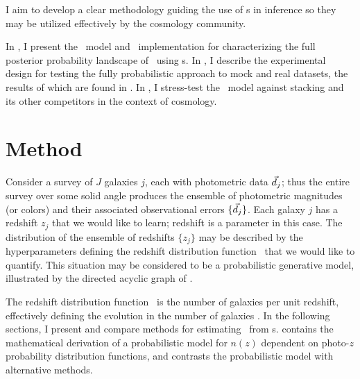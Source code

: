 
I aim to develop a clear methodology guiding the use of \pzpdf s in inference so they may be utilized effectively by the cosmology community.

In , I present the \Chippr\ model and \chippr\ implementation for characterizing the full posterior probability landscape of \Nz\ using \pzpdf s. 
In , I describe the experimental design for testing the fully probabilistic approach to mock and real datasets, the results of which are found in .
In , I stress-test the \Chippr\ model against stacking and its other competitors in the context of cosmology.

\section{Method}


Consider a survey of $J$ galaxies $j$, each with photometric data $\vec{d}_{j}$; thus the entire survey over some solid angle produces the ensemble of photometric magnitudes (or colors) and their associated observational errors $\{\vec{d}_{j}\}$.  
Each galaxy $j$ has a redshift $z_{j}$ that we would like to learn; redshift is a parameter in this case.  
The distribution of the ensemble of redshifts $\{z_{j}\}$ may be described by the hyperparameters defining the redshift distribution function \nz\ that we would like to quantify.  
This situation may be considered to be a probabilistic generative model, illustrated by the directed acyclic graph of .  

The redshift distribution function \nz\ is the number of galaxies per unit redshift, effectively defining the evolution in the number of galaxies \citep{Menard2013}.  
In the following sections, I present and compare methods for estimating \nz\ from \pzpdf s.  
 contains the mathematical derivation of a probabilistic model for $n(z)$ dependent on photo-$z$ probability distribution functions, and  contrasts the probabilistic model with alternative methods.

